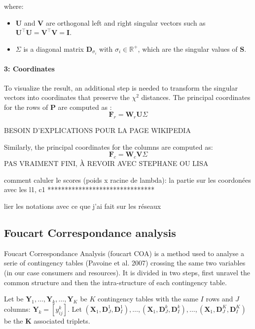 where:
\begin{itemize}
    \item $\mathbf{U}$ and $\mathbf{V}$ are orthogonal left and right singular vectors such as $\mathbf{U}^\intercal\mathbf{U} = \mathbf{V}^\intercal\mathbf{V} = \mathbf{I}$.
    \item  $\Sigma$ is a diagonal matrix $\mathbf{D}_{\sigma_i}$ with $\sigma_i \in \mathbb{R}^+$, which are the singular values of $\mathbf{S}$.
\end{itemize}


\paragraph{3: Coordinates}

To visualize the result, an additional step is needed to transform the singular vectors into coordinates that preserve the $\chi^2$ distances. The principal coordinates for the rows of $\mathbf{P}$ are computed as :
$$
    \mathbf{F}_r = \mathbf{W}_r \mathbf{U} \Sigma
$$

BESOIN D'EXPLICATIONS POUR LA PAGE WIKIPEDIA

Similarly, the principal coordinates for the columns are computed as:
$$
    \mathbf{F}_c = \mathbf{W}_c \mathbf{V} \Sigma
$$ 
PAS VRAIMENT FINI, À REVOIR AVEC STEPHANE OU LISA

comment caluler le scores (poids x racine de lambda): la partie sur les coordonées avec les l1, c1
*******************************


lier les notations avec ce que j'ai fait sur les réseaux



\subsection{Foucart Correspondance analysis}

Foucart Correspondance Analysis (foucart COA) is a method used to analyse a serie of contingency tables (Pavoine et al. 2007) crossing the same two variables (in our case consumers and resources).
It is divided in two steps, first unravel the common structure and then the intra-structure of each contingency table.

Let be $\mathbf{Y}_1, \ldots, \mathbf{Y}_k, \ldots, \mathbf{Y}_K$ be $K$ contingency tables with the same $I$ rows and $J$ columns: $\mathbf{Y}_k = [y_{ij}^k]$. 
Let $(\mathbf{X}_1, \mathbf{D}_J^1, \mathbf{D}_I^1), \ldots, (\mathbf{X}_1, \mathbf{D}_J^k, \mathbf{D}_I^k), \ldots, (\mathbf{X}_1, \mathbf{D}_J^K, \mathbf{D}_I^K)$ be the $\mathbf{K}$ associated triplets.

